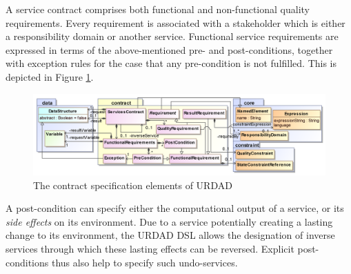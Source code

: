 A service contract comprises both functional and non-functional quality requirements. Every requirement is associated with a stakeholder which is either a responsibility domain or another service. Functional service requirements are expressed in terms of the above-mentioned pre- and post-conditions, together with exception rules for the case that any pre-condition is not fulfilled. This is depicted in Figure \ref{fig:contractModule}.
\begin{figure}[Htbp]
  \centering
  \includegraphics{contract}
  \caption{The contract specification elements of URDAD}
  \label{fig:contractModule}
\end{figure}

A post-condition can specify either the computational output of a service, or its \emph{side effects} on its environment. Due to a service potentially creating a lasting change to its environment, the URDAD DSL allows the designation of inverse services through which these lasting effects can be reversed. Explicit post-conditions thus also help to specify such undo-services.

